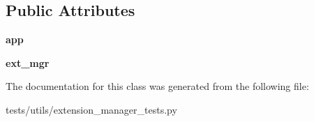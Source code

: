 \subsection*{Public Attributes}
\begin{DoxyCompactItemize}
\item 
\hypertarget{classtests_1_1utils_1_1extension__manager__tests_1_1ExtensionSettingsTestCase_ad69eeb2a244780bb42fa81a4a5eca1b7}{{\bfseries app}}\label{classtests_1_1utils_1_1extension__manager__tests_1_1ExtensionSettingsTestCase_ad69eeb2a244780bb42fa81a4a5eca1b7}

\item 
\hypertarget{classtests_1_1utils_1_1extension__manager__tests_1_1ExtensionSettingsTestCase_ac2c652333c649703f486eeaf7233c3c9}{{\bfseries ext\-\_\-mgr}}\label{classtests_1_1utils_1_1extension__manager__tests_1_1ExtensionSettingsTestCase_ac2c652333c649703f486eeaf7233c3c9}

\end{DoxyCompactItemize}


The documentation for this class was generated from the following file\-:\begin{DoxyCompactItemize}
\item 
tests/utils/extension\-\_\-manager\-\_\-tests.\-py\end{DoxyCompactItemize}
